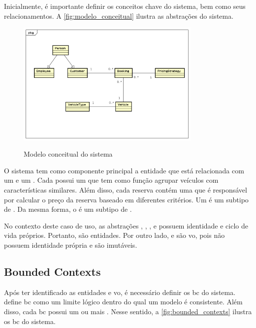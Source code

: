 Inicialmente, é importante definir os conceitos chave do sistema, bem como seus relacionamentos. A \autoref{fig:modelo_conceitual} ilustra as abstrações do sistema.

\begin{figure}[H]
    \centering
    \caption{Modelo conceitual do sistema}
    \includegraphics[width=0.8\textwidth]{media/modelo_conceitual.png}
    \label{fig:modelo_conceitual}
\end{figure}

O sistema tem como componente principal a entidade  que está relacionada com um  e um . Cada  possui um  que tem como função agrupar veículos com características similares. Além disso, cada reserva contém uma  que é responsável por calcular o preço da reserva baseado em diferentes critérios. Um  é um subtipo de . Da mesma forma, o  é um subtipo de .

No contexto deste caso de uso, as abstrações , , ,  e  possuem identidade e ciclo de vida próprios. Portanto, são entidades. Por outro lado,  e  são \acrfull{vo}, pois não possuem identidade própria e são imutáveis. 

\subsection{Bounded Contexts}
Após ter identificado as entidades e \acrfull{vo}, é necessário definir os \acrfull{bc} do sistema.  define \acrshort{bc} como um limite lógico dentro do qual um modelo é consistente. Além disso, cada \acrshort{bc} possui um ou mais . Nesse sentido, a \autoref{fig:bounded_contexts} ilustra os \acrshort{bc} do sistema.

